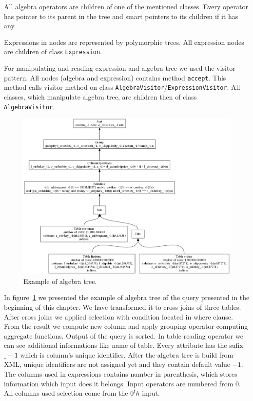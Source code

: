 All algebra operators are children of one of the mentioned classes. Every operator has pointer to its parent in the tree and smart pointers to its children if it has any. 

Expressions in nodes are represented by polymorphic trees. All expression nodes are children of class \texttt{Expression}.

For manipulating and reading expression and algebra tree we used the visitor pattern. All nodes (algebra and expression) contains method \texttt{accept}. This method calls visitor method on class \texttt{AlgebraVisitor}/\texttt{ExpressionVisitor}. All classes, which manipulate algebra tree, are children then of class \texttt{AlgebraVisitor}.


\begin{figure}[h!]
  \centering
    \includegraphics[width=1.0\textwidth]{algebratree1}

      \caption{Example of algebra tree.}
          \label{fig:algebratree1}
\end{figure}

In figure~\ref{fig:algebratree1} we presented the example of algebra tree of the query presented in the beginning of this chapter. We have transformed it to cross joins of three tables. After cross joins we applied selection with condition located in where clause. From the result we compute new column and apply grouping operator computing aggregate functions. Output of the query is sorted. In table reading operator we can see additional informations like name of table. Every attribute has the sufix $\_-1$ which is column's unique identifier. After the algebra tree is build from XML, unique identifiers are not assigned yet and they contain default value $-1$. The columns used in expressions contains number in parenthesis, which stores information which input does it belongs. Input operators are numbered from $0$. All columns used selection come from the $0^th$ input.

